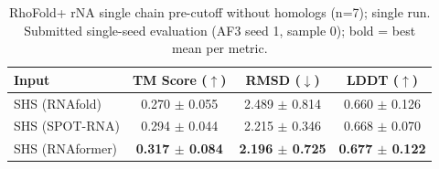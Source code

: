 \begin{table}[htbp]
\centering
\caption{RhoFold+ rNA single chain pre-cutoff without homologs (n=7); single run. Submitted single-seed evaluation (AF3 seed 1, sample 0); bold = best mean per metric.}
\label{tab:rf_rna_single_chain_pre_cutoff_without_homologs}
\begin{tabular}{lccc}
\toprule
Input & TM Score ($\uparrow$) & RMSD ($\downarrow$) & LDDT ($\uparrow$) \\
\midrule
SHS (RNAfold) & 0.270 $\pm$ 0.055 & 2.489 $\pm$ 0.814 & 0.660 $\pm$ 0.126 \\
SHS (SPOT-RNA) & 0.294 $\pm$ 0.044 & 2.215 $\pm$ 0.346 & 0.668 $\pm$ 0.070 \\
SHS (RNAformer) & \textbf{0.317 $\pm$ 0.084} & \textbf{2.196 $\pm$ 0.725} & \textbf{0.677 $\pm$ 0.122} \\
\bottomrule
\end{tabular}
\end{table}
